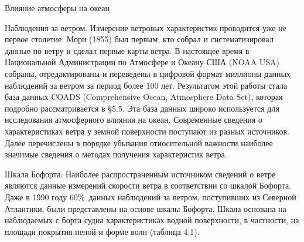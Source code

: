 \begin{chapter}{Влияние атмосферы на океан}
\begin{section}{Наблюдения за ветром.}
Измерение ветровых характеристик проводится уже не первое
столетие. Мори (1855) был первым, кто собрал и систематизировал данные
по ветру и сделал первые карты ветра. В настоящее время в Национальной
Администрации по Атмосфере и Океану США (NOAA USA) собраны,
отредактированы и переведены в цифровой формат миллионы данных
наблюдений за ветром за период более 100 лет. Результатом этой работы
стала база данных COADS (Comprehensive Ocean, Atmosphere Data Set),
которая подробно рассматривается в §5.5. Эта база данных широко
используется для исследования атмосферного влияния на океан.
Современные сведения о характеристиках ветра у земной поверхности
поступают из разных источников. Далее перечислены в порядке убывания
относительной важности наиболее значимые сведения о методах получения
характеристик ветра.
%
  



\begin{paragraph}{Шкала Бофорта.}
Наиболее распространенным источником сведений о ветре являются данные
измерений скорости ветра в соответствии со шкалой Бофорта. Даже в 1990
году 60\%~данных наблюдений за ветром, поступивших из Северной
Атлантики, были представлены на основе шкалы Бофорта. Шкала основана
на наблюдаемых с борта судна характеристиках водной поверхности, в
частности, на площади покрытия пеной и форме волн (таблица 4.1).
%


\end{paragraph}
\end{section}
\end{chapter}
